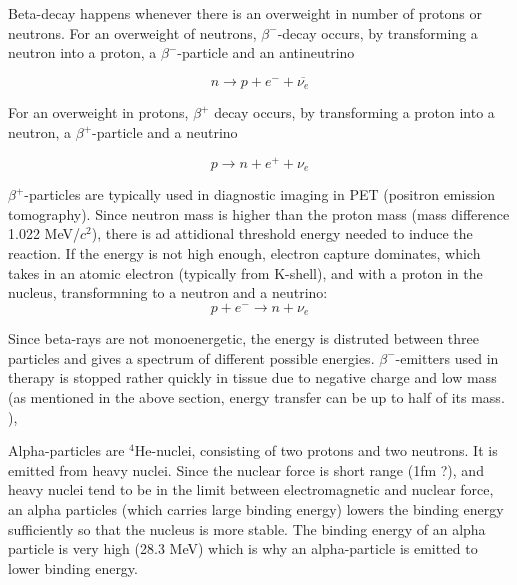 \noindent
Beta-decay happens whenever there is an overweight in number of protons or neutrons. For an overweight of neutrons, $\beta^-$-decay occurs, by transforming a neutron into a proton, a $\beta^-$-particle and an antineutrino

\begin{equation}
    n \rightarrow p + e^- + \overline{{\nu_e}}
\end{equation}

\noindent
For an overweight in protons, $\beta^+$ decay occurs, by transforming a proton into a neutron, a $\beta^+$-particle and a neutrino

\begin{equation}
    p \rightarrow n + e^+ + {\nu_e}
\end{equation}

$\beta^+$-particles are typically used in diagnostic imaging in PET (positron emission tomography). 
\noindent Since neutron mass is higher than the proton mass (mass difference 1.022 MeV/$c^2$), there is ad attidional threshold energy needed to induce the reaction. If the energy is not high enough, electron capture dominates, which takes in an atomic electron (typically from K-shell), and with a proton in the nucleus, transformning to a neutron and a neutrino:
\begin{equation}
    p + e^- \rightarrow n + \nu_e 
\end{equation}

Since beta-rays are not monoenergetic, the energy is distruted between three particles and gives a spectrum of different possible energies. $\beta^-$-emitters used in therapy is stopped rather quickly in tissue due to negative charge and low mass (as mentioned in the above section, energy transfer can be up to half of its mass. ), 

Alpha-particles are $^{4}$He-nuclei, consisting of two protons and two neutrons. It is emitted from heavy nuclei. Since the nuclear force is short range (1fm ?), and heavy nuclei tend to be in the limit between electromagnetic and nuclear force, an alpha particles (which carries large binding energy) lowers the binding energy sufficiently so that the nucleus is more stable. The binding energy of an alpha particle is very high (28.3 MeV) which is why an alpha-particle is emitted to lower binding energy. 

